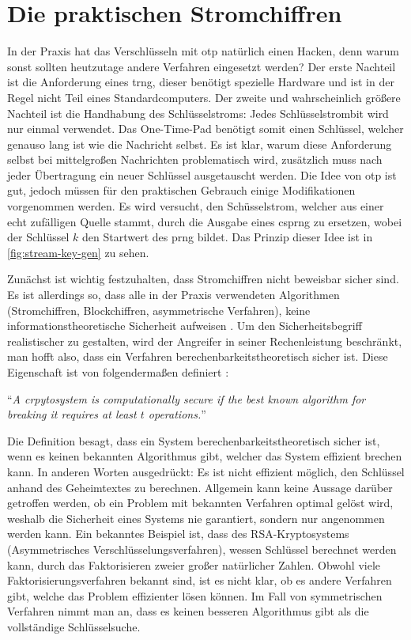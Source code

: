 \section{Die praktischen Stromchiffren}
In der Praxis hat das Verschlüsseln mit \ac{otp} natürlich einen Hacken, denn warum sonst
sollten heutzutage andere Verfahren eingesetzt werden?
Der erste Nachteil ist die Anforderung eines \ac{trng}, dieser benötigt spezielle
Hardware und ist in der Regel nicht Teil eines Standardcomputers.
Der zweite und wahrscheinlich größere Nachteil ist die Handhabung des Schlüsselstroms:
Jedes Schlüsselstrombit wird nur einmal verwendet.
Das One-Time-Pad benötigt somit einen Schlüssel, welcher genauso lang ist
wie die Nachricht selbst. Es ist klar, warum diese Anforderung
selbst bei mittelgroßen Nachrichten problematisch wird, zusätzlich muss nach jeder
Übertragung ein neuer Schlüssel ausgetauscht werden. Die Idee von \ac{otp} ist gut,
jedoch müssen für den praktischen Gebrauch einige Modifikationen vorgenommen werden.
Es wird versucht, den Schüsselstrom, welcher aus einer echt zufälligen Quelle stammt,
durch die Ausgabe eines \ac{csprng} zu ersetzen, wobei der Schlüssel $k$
den Startwert des \ac{prng} bildet. Das Prinzip dieser Idee ist in
\autoref{fig:stream-key-gen} zu sehen.



\noindent
Zunächst ist wichtig festzuhalten, dass
Stromchiffren nicht beweisbar sicher sind. Es ist allerdings so, dass alle in der
Praxis verwendeten Algorithmen (Stromchiffren, Blockchiffren, asymmetrische
Verfahren), keine informationstheoretische Sicherheit aufweisen \parencite[38]{BOOK:crypto}.
Um den Sicherheitsbegriff realistischer zu gestalten, wird der Angreifer in seiner
Rechenleistung beschränkt, man hofft also, dass ein Verfahren berechenbarkeitstheoretisch
sicher ist. Diese Eigenschaft ist von \citeauthor{BOOK:crypto}
folgendermaßen definiert \parencite*[35]{BOOK:crypto}:

\begin{definition}
  \enquote{\textit{A crpytosystem is computationally secure if the best
      known algorithm for breaking it requires at least $t$ operations.}}
\end{definition}

\noindent
Die Definition besagt, dass ein System berechenbarkeitstheoretisch sicher ist, wenn es
keinen bekannten Algorithmus gibt, welcher das System effizient brechen kann.
In anderen Worten ausgedrückt: Es ist nicht effizient möglich, den
Schlüssel anhand des Geheimtextes zu berechnen. Allgemein kann keine
Aussage darüber getroffen werden, ob ein Problem mit bekannten Verfahren
optimal gelöst wird, weshalb die Sicherheit eines Systems nie garantiert,
sondern nur angenommen werden kann. Ein bekanntes Beispiel ist, dass des RSA-Kryptosystems
(Asymmetrisches Verschlüsselungsverfahren), wessen Schlüssel
berechnet werden kann, durch das Faktorisieren zweier großer
natürlicher Zahlen. Obwohl viele Faktorisierungsverfahren bekannt sind, ist es nicht klar,
ob es andere Verfahren gibt, welche das Problem effizienter lösen können.
Im Fall von symmetrischen Verfahren nimmt man an, dass es keinen besseren Algorithmus
gibt als die vollständige Schlüsselsuche.
